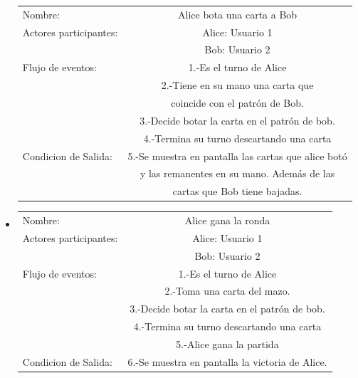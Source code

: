 \begin{itemize}
        \begin{tabular}{ l | c  }
            Nombre:            & Alice bota una carta a Bob\\
            Actores participantes: & Alice: Usuario  1                                              \\
                                            & Bob: Usuario  2                                              \\\hline
            Flujo de eventos:               & 1.-Es el turno de Alice                                 \\
                                            & 2.-Tiene en su mano una carta que\\ & coincide con el patrón de Bob.\\
                                            & 3.-Decide botar la carta en el patrón de bob. \\
                                            & 4.-Termina su turno descartando una carta               \\
            Condicion de Salida:            & 5.-Se muestra en pantalla las cartas que alice botó\\
                                                & y las remanentes en su mano. Además de las \\ & cartas que Bob tiene bajadas.             \\\hline
            \hline
        \end{tabular}
\item
        \begin{tabular}{ l | c  }
            Nombre:            & Alice gana la ronda\\
            Actores participantes: & Alice: Usuario  1 \\
                                            & Bob: Usuario  2  \\\hline
            Flujo de eventos:               & 1.-Es el turno de Alice                                 \\
                                            & 2.-Toma una carta del mazo.\\
                                            & 3.-Decide botar la carta en el patrón de bob. \\
                                            & 4.-Termina su turno descartando una carta \\
                                            & 5.-Alice gana la partida \\\hline
            Condicion de Salida:            & 6.-Se muestra en pantalla la victoria de Alice. \\
        \end{tabular}
            
\end{itemize}
